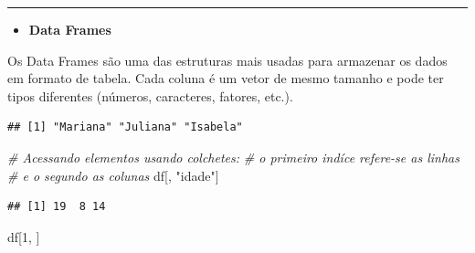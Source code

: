 \documentclass[
]{book}
\newenvironment{Shaded}{\begin{snugshade}}{\end{snugshade}}
\newcommand{\AttributeTok}[1]{\textcolor[rgb]{0.13,0.29,0.53}{#1}}
\newcommand{\CommentTok}[1]{\textcolor[rgb]{0.56,0.35,0.01}{\textit{#1}}}
\newcommand{\DecValTok}[1]{\textcolor[rgb]{0.00,0.00,0.81}{#1}}
\newcommand{\FloatTok}[1]{\textcolor[rgb]{0.00,0.00,0.81}{#1}}
\newcommand{\FunctionTok}[1]{\textcolor[rgb]{0.13,0.29,0.53}{\textbf{#1}}}
\newcommand{\NormalTok}[1]{#1}
\newcommand{\OtherTok}[1]{\textcolor[rgb]{0.56,0.35,0.01}{#1}}
\newcommand{\SpecialCharTok}[1]{\textcolor[rgb]{0.81,0.36,0.00}{\textbf{#1}}}
\newcommand{\StringTok}[1]{\textcolor[rgb]{0.31,0.60,0.02}{#1}}
\providecommand{\tightlist}{%
  \setlength{\itemsep}{0pt}\setlength{\parskip}{0pt}}
\begin{document}
\begin{center}\rule{0.5\linewidth}{0.5pt}\end{center}

\begin{itemize}
\tightlist
\item
  \textbf{Data Frames}
\end{itemize}

Os Data Frames são uma das estruturas mais usadas para armazenar os dados em formato de tabela.
Cada coluna é um vetor de mesmo tamanho e pode ter tipos diferentes (números, caracteres, fatores, etc.).

\begin{Shaded}
\end{Shaded}

\begin{verbatim}
## [1] "Mariana" "Juliana" "Isabela"
\end{verbatim}

\begin{Shaded}
\begin{Highlighting}[]
\CommentTok{\# Acessando elementos usando colchetes:}
\CommentTok{\# o primeiro indíce refere{-}se as linhas }
\CommentTok{\# e o segundo as colunas}
\NormalTok{df[, }\StringTok{"idade"}\NormalTok{]  }
\end{Highlighting}
\end{Shaded}

\begin{verbatim}
## [1] 19  8 14
\end{verbatim}

\begin{Shaded}
\begin{Highlighting}[]
\NormalTok{df[}\DecValTok{1}\NormalTok{, ]        }
\end{Highlighting}
\end{Shaded}
\end{document}
